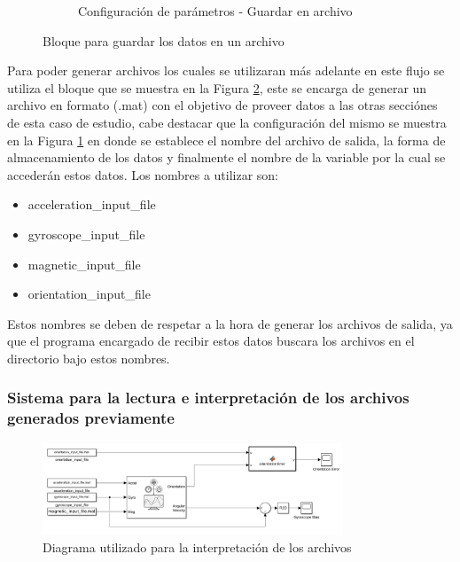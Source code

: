 \begin{figure}[htbp]
\begin{subfigure}[b]{0.45\textwidth}
        \caption{Configuración de parámetros - Guardar en archivo}
        \label{fig:config_to_file_IMU}
    \end{subfigure}
    \caption{Bloque para guardar los datos en un archivo}
    \label{fig:to_file_IMU}
\end{figure}

Para poder generar archivos los cuales se utilizaran más adelante en este flujo se utiliza el bloque que se muestra en la Figura \ref{fig:to_file_IMU}, este se encarga de generar un archivo en formato (.mat) con el objetivo de proveer datos a las otras secciónes de esta caso de estudio, cabe destacar que la configuración del mismo se muestra en la Figura \ref{fig:config_to_file_IMU} en donde se establece el nombre del archivo de salida, la forma de almacenamiento de los datos y finalmente el nombre de la variable por la cual se accederán estos datos. Los nombres a utilizar son:

\begin{itemize}
    \item acceleration\_input\_file
    \item gyroscope\_input\_file
    \item magnetic\_input\_file
    \item orientation\_input\_file
\end{itemize}

Estos nombres se deben de respetar a la hora de generar los archivos de salida, ya que el programa encargado de recibir estos datos buscara los archivos en el directorio bajo estos nombres.

\newpage

\subsubsection{Sistema para la lectura e interpretación de los archivos generados previamente}

\begin{figure}[h!]
    \centering
    \includegraphics[width=0.8\textwidth]{fig/Capitulo5/Caso_de_estudio_IMU/Generador_de_salidas/flujo_lector_de_archivos.pdf}
    \caption{Diagrama utilizado para la interpretación de los archivos \cite{mathworks2024imu}}
    \label{fig:caso_de_estudio_2_IMU_interpretacion_de_archivos}
\end{figure}


